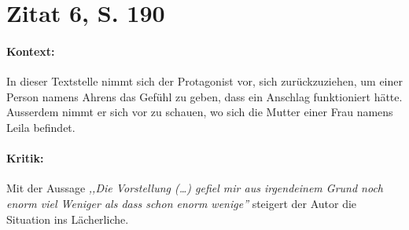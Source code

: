 \documentclass[12pt,twoside,a4paper]{article}
\begin{document}
	
	
	\section{Zitat 6, S. 190}
	
	\paragraph{Kontext:} In dieser Textstelle nimmt sich der Protagonist vor, sich zurückzuziehen, um einer Person namens Ahrens das Gefühl zu geben, dass ein Anschlag funktioniert hätte. Ausserdem nimmt er sich vor zu schauen, wo sich die Mutter einer Frau namens Leila befindet.
	
	\paragraph{Kritik:} Mit der Aussage \textit{,,Die Vorstellung (\dots) gefiel mir aus irgendeinem Grund noch enorm viel Weniger als dass schon enorm wenige''} steigert der Autor die Situation ins Lächerliche.
	
	
\end{document}
